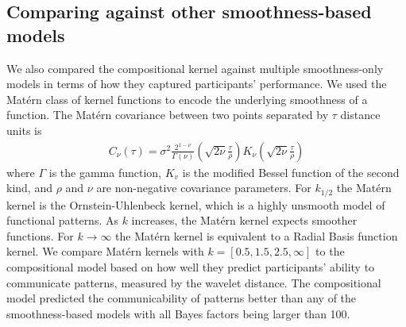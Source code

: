\documentclass[a4paper,man, floatsintext, natbib]{apa6}
\begin{document}
\subsection{Comparing against other smoothness-based models}
We also compared the compositional kernel against multiple smoothness-only models in terms of how they captured participants' performance. We used the Mat\'ern class of kernel functions to encode the underlying smoothness of a function. The Mat\'ern covariance between two points separated by $\tau$ distance units is
\begin{align}
C_{\nu}(\tau)=\sigma^2\frac{2^{1-\nu}}{\Gamma(\nu)}\left(\sqrt{2\nu}\frac{\tau}{\rho}\right)K_\nu\left(\sqrt{2\nu}\frac{\tau}{\rho} \right)
\end{align}
where $\Gamma$ is the gamma function, $K_v$ is the modified Bessel function of the second kind, and $\rho$ and $\nu$ are non-negative covariance parameters. For $k_{1/2}$ the Mat\'ern kernel is the Ornstein-Uhlenbeck kernel, which is a highly unsmooth model of functional patterns. As $k$ increases, the Mat\'ern kernel expects smoother functions. For $k \to \infty$ the Mat\'ern kernel is equivalent to a Radial Basis function kernel. We compare Mat\'ern kernels with $k=[0.5, 1.5, 2.5, \infty]$ to the compositional model based on how well they predict participants' ability to communicate patterns, measured by the wavelet distance. The compositional model predicted the communicability of patterns better than any of the smoothness-based models with all Bayes factors being larger than 100.




\end{document}
